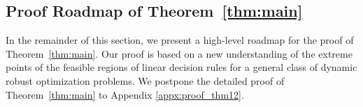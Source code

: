 \documentclass[nonblindrev,mnsc]{informs3} %
\begin{document}
\subsection*{Proof Roadmap of Theorem~\ref{thm:main}} \label{sec:sparsity:proof}

In the remainder of this section, we present a high-level roadmap for the proof of Theorem~\ref{thm:main}. Our proof is based on a new understanding of the extreme points of the feasible regions of linear decision rules for a general class of dynamic robust optimization problems. We postpone the detailed proof of  Theorem~\ref{thm:main} to Appendix \ref{appx:proof_thm12}. %
\end{document}
